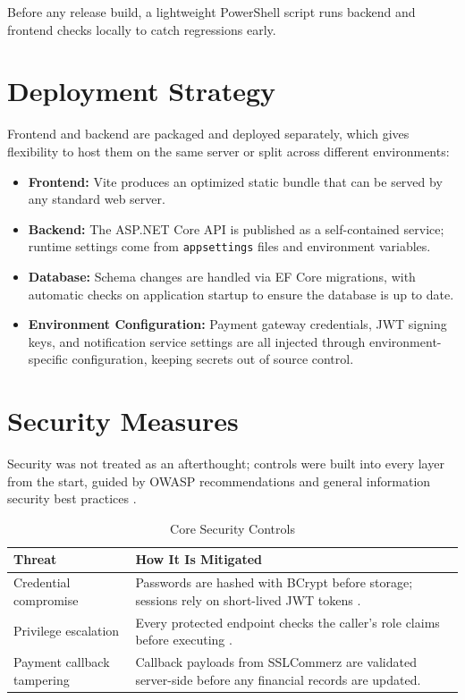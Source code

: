 \documentclass{thesis-library}
\begin{document}
Before any release build, a lightweight PowerShell script runs backend and frontend checks locally to catch regressions early.

\section{Deployment Strategy}

Frontend and backend are packaged and deployed separately, which gives flexibility to host them on the same server or split across different environments:
\begin{itemize}
    \item \textbf{Frontend:} Vite produces an optimized static bundle that can be served by any standard web server.
    \item \textbf{Backend:} The ASP.NET Core API is published as a self-contained service; runtime settings come from \texttt{appsettings} files and environment variables.
    \item \textbf{Database:} Schema changes are handled via EF Core migrations, with automatic checks on application startup to ensure the database is up to date.
    \item \textbf{Environment Configuration:} Payment gateway credentials, JWT signing keys, and notification service settings are all injected through environment-specific configuration, keeping secrets out of source control.
\end{itemize}

\section{Security Measures}

Security was not treated as an afterthought; controls were built into every layer from the start, guided by OWASP recommendations \cite{owasp2021top10} and general information security best practices \cite{iso27001security}.

\begin{table}[H]
    \centering
    \caption{Core Security Controls}
    \vspace{10pt}
    \begin{tabularx}{\linewidth}{|P{4.5cm}|L|}
        \hline
        \textbf{Threat} & \textbf{How It Is Mitigated} \\
        \hline
        Credential compromise & Passwords are hashed with BCrypt before storage; sessions rely on short-lived JWT tokens \cite{provos1999bcrypt,jones2015jwt}. \\
        \hline
        Privilege escalation & Every protected endpoint checks the caller's role claims before executing \cite{sandhu1996rbac}. \\
        \hline
        Payment callback tampering & Callback payloads from SSLCommerz are validated server-side before any financial records are updated. \\
        \hline
    \end{tabularx}
\end{table}
\end{document}
